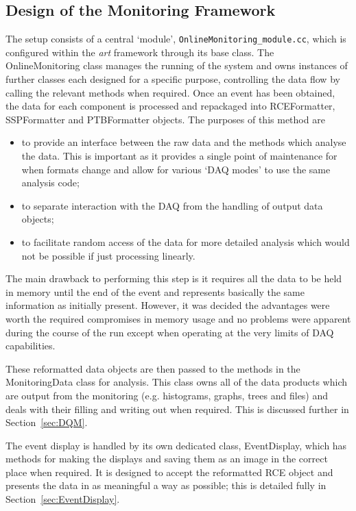 \subsection{Design of the Monitoring Framework}\label{sec:MonitoringFrameworkDesign}

The setup consists of a central `module', \texttt{OnlineMonitoring\_module.cc}, which is configured within the \textit{art} framework through its base class.  The OnlineMonitoring class manages the running of the system and owns instances of further classes each designed for a specific purpose, controlling the data flow by calling the relevant methods when required.  Once an event has been obtained, the data for each component is processed and repackaged into RCEFormatter, SSPFormatter and PTBFormatter objects.  The purposes of this method are
\begin{itemize}
\item to provide an interface between the raw data and the methods which analyse the data.  This is important as it provides a single point of maintenance for when formats change and allow for various `DAQ modes' to use the same analysis code;
\item to separate interaction with the DAQ from the handling of output data objects;
\item to facilitate random access of the data for more detailed analysis which would not be possible if just processing linearly.
\end{itemize}
The main drawback to performing this step is it requires all the data to be held in memory until the end of the event and represents basically the same information as initially present.  However, it was decided the advantages were worth the required compromises in memory usage and no problems were apparent during the course of the run except when operating at the very limits of DAQ capabilities.

These reformatted data objects are then passed to the methods in the MonitoringData class for analysis.  This class owns all of the data products which are output from the monitoring (e.g. histograms, graphs, trees and files) and deals with their filling and writing out when required.  This is discussed further in Section~\ref{sec:DQM}.

The event display is handled by its own dedicated class, EventDisplay, which has methods for making the displays and saving them as an image in the correct place when required.  It is designed to accept the reformatted RCE object and presents the data in as meaningful a way as possible; this is detailed fully in Section~\ref{sec:EventDisplay}.

